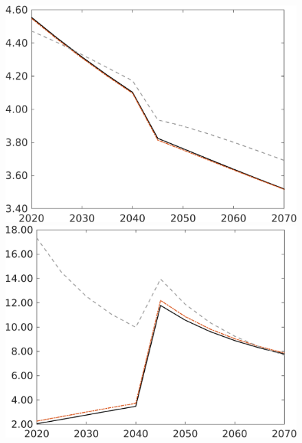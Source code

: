 \begin{figure}[h!!]
\begin{minipage}[]{0.32\textwidth}
\end{minipage}
\begin{minipage}[]{0.32\textwidth}
	\includegraphics[width=1\textwidth]{../../codding_model/own_basedOnFried/optimalPol_010922_revision/figures/all_13Sept22/CompRed_TaulCalib_gAn_spillover0_knspil0_nsk0_xgr0_sep0_LFlimit1_emsbase0_countec0_GovRev0_etaa0.79_lgd0.png}
\end{minipage}
\begin{minipage}[]{0.32\textwidth}
\includegraphics[width=1\textwidth]{../../codding_model/own_basedOnFried/optimalPol_010922_revision/figures/all_13Sept22/CompRed_TaulCalib_gAg_spillover0_knspil0_nsk0_xgr0_sep0_LFlimit1_emsbase0_countec0_GovRev0_etaa0.79_lgd0.png}

\end{minipage}
\end{figure}

